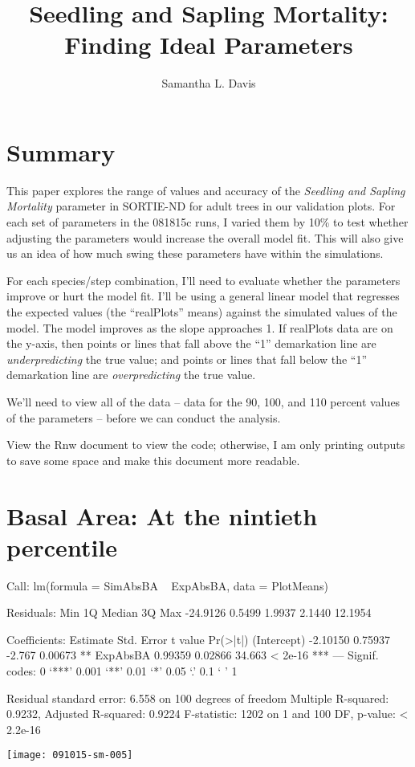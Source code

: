 \documentclass{article}
\begin{document}


\title{Seedling and Sapling Mortality: Finding Ideal Parameters}
\author{Samantha L. Davis}

\maketitle

\section{Summary}
This paper explores the range of values and accuracy of the \textit{Seedling and Sapling Mortality} parameter in SORTIE-ND for adult trees in our validation plots. For each set of parameters in the 081815c runs, I varied them by 10\% to test whether adjusting the parameters would increase the overall model fit. This will also give us an idea of how much swing these parameters have within the simulations. 

For each species/step combination, I'll need to evaluate whether the parameters improve or hurt the model fit. I'll be using a general linear model that regresses the expected values (the ``realPlots'' means) against the simulated values of the model. The model improves as the slope approaches 1. If realPlots data are on the y-axis, then points or lines that fall above the ``1'' demarkation line are \textit{underpredicting} the true value; and points or lines that fall below the ``1'' demarkation line are \textit{overpredicting} the true value.

We'll need to view all of the data -- data for the 90, 100, and 110 percent values of the parameters -- before we can conduct the analysis. 

View the Rnw document to view the code; otherwise, I am only printing outputs to save some space and make this document more readable.







\newpage

\section{Basal Area: At the nintieth percentile}
\begin{Schunk}
\begin{Soutput}
Call:
lm(formula = SimAbsBA ~ ExpAbsBA, data = PlotMeans)

Residuals:
     Min       1Q   Median       3Q      Max 
-24.9126   0.5499   1.9937   2.1440  12.1954 

Coefficients:
            Estimate Std. Error t value Pr(>|t|)    
(Intercept) -2.10150    0.75937  -2.767  0.00673 ** 
ExpAbsBA     0.99359    0.02866  34.663  < 2e-16 ***
---
Signif. codes:  0 ‘***’ 0.001 ‘**’ 0.01 ‘*’ 0.05 ‘.’ 0.1 ‘ ’ 1

Residual standard error: 6.558 on 100 degrees of freedom
Multiple R-squared:  0.9232,	Adjusted R-squared:  0.9224 
F-statistic:  1202 on 1 and 100 DF,  p-value: < 2.2e-16
\end{Soutput}
\end{Schunk}
\texttt{[image: 091015-sm-005]}
\end{document}
